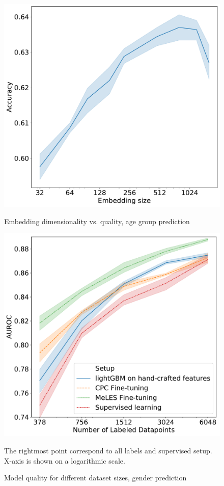 \documentclass{article}
\begin{document}
\begin{figure}
  \centering
  \begin{minipage}[t]{0.49\linewidth}
    \includegraphics[width=\linewidth]{figures/age-pred-hidden-size.pdf}
    \caption{Embedding dimensionality vs. quality, age group prediction}
    \label{fig-emb-dim-age}
  \end{minipage}
  \hfill%
  \begin{minipage}[t]{0.49\linewidth}
    \includegraphics[width=\linewidth]{figures/ss_gen_4.pdf}
    \caption{Model quality for different dataset sizes, gender prediction}
    \small{The rightmost point correspond to all labels and supervised setup. X-axis is shown on a logarithmic scale.}
    \label{fig-semi-gender}
  \end{minipage}
\end{figure}
\end{document}
